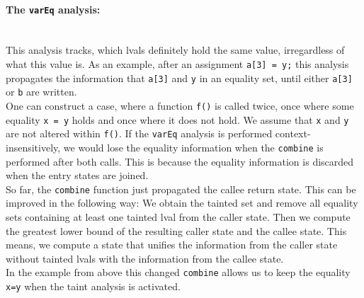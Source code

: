       \paragraph{The \texttt{varEq} analysis:}\mbox{}\\
        This analysis tracks, which \ac{lval}s definitely hold the same value, irregardless of what this value is. As an example, after an assignment \texttt{a[3] = y;} this analysis propagates the information that \texttt{a[3]} and \texttt{y} in an equality set, until either \texttt{a[3]} or \texttt{b} are written.\\
        One can construct a case, where a function \texttt{f()} is called twice, once where some equality \texttt{x = y} holds and once where it does not hold. We assume that \texttt{x} and \texttt{y} are not altered within \texttt{f()}. If the \texttt{varEq} analysis is performed context-insensitively, we would lose the equality information when the \texttt{combine} is performed after both calls. This is because the equality information is discarded when the entry states are joined.\\
        So far, the \texttt{combine} function just propagated the callee return state. This can be improved in the following way: We obtain the tainted set and remove all equality sets containing at least one tainted \ac{lval} from the caller state. Then we compute the greatest lower bound of the resulting caller state and the callee state. This means, we compute a state that unifies the information from the caller state without tainted \ac{lval}s with the information from the callee state.\\
        In the example from above this changed \texttt{combine} allows us to keep the equality \texttt{x=y} when the taint analysis is activated.

